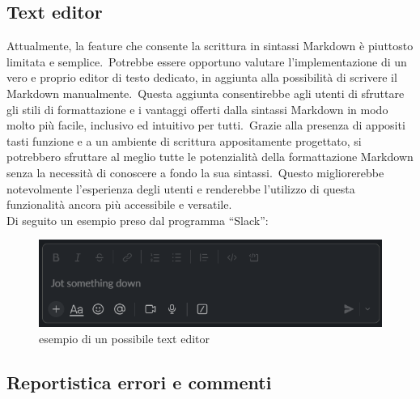\subsection{Text editor}\label{sec:cap_sec_subsec}
Attualmente, la feature che consente la scrittura in sintassi Markdown è piuttosto limitata e semplice.\
Potrebbe essere opportuno valutare l'implementazione di un vero e proprio editor di testo dedicato, 
in aggiunta alla possibilità di scrivere il Markdown manualmente.\ Questa aggiunta consentirebbe agli 
utenti di sfruttare gli stili di formattazione e i vantaggi offerti dalla sintassi Markdown in modo molto più facile, 
inclusivo ed intuitivo per tutti.\ Grazie alla presenza di appositi tasti funzione e a un ambiente di scrittura 
appositamente progettato, si potrebbero sfruttare al meglio tutte le potenzialità della formattazione Markdown 
senza la necessità di conoscere a fondo la sua sintassi.\ Questo migliorerebbe notevolmente l'esperienza degli 
utenti e renderebbe l'utilizzo di questa funzionalità ancora più accessibile e versatile.
\\
Di seguito un esempio preso dal programma ``Slack'':
\begin{figure}[ht]
	\centering
	\includegraphics[width=\textwidth]{img/textEditor.png}
	\caption{esempio di un possibile text editor}
	\label{fig:textEditor}
\end{figure}
%
%
\subsection{Reportistica errori e commenti}\label{sec:cap_sec_subsec}
